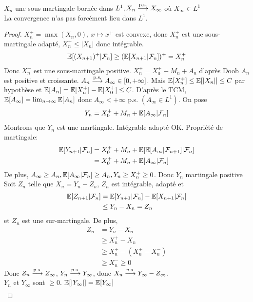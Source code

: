 \documentclass[]{report}
\begin{document}
    \begin{tm}{}{}
        $X_n$ une sous-martingale bornée dans $L^1,X_n \overset{\text{p.s.}}{\longrightarrow} X_\infty$ où $X_\infty\in L^1$ \\
        \danger La convergence n'as pas forcément lieu dans $L^1$.
    \end{tm}

    \begin{proof}
        $X_n^+=\max(X_n,0)$,  $x\mapsto x^+$ est convexe, donc $X_n^+$ est une sous-martingale adapté, $X_n^+\le |X_n|$ donc intégrable.\\
        \[\mathbb{E}[(X_{n+1})^+|\mathcal{F}_n]\ge (\mathbb{E}[X_{n+1}|\mathcal{F}_n])^+=X_n^+\]
        Donc $X_n^+$ est une sous-martingale positive. $X_n^+=X_0^++M_n+A_n$ d'après Doob $A_n$ est positive et croissante. $A_n\overset{\text{p.s.}}{\longrightarrow} A_\infty\in [0,+\infty]$. Mais $\mathbb{E}[X_n^+]\le \mathbb{E}[|X_n|]\le C$ par hypothèse et $\mathbb{E}[A_n]=\mathbb{E}[X_n^+]-\mathbb{E}[X_0^+]\le C$. D'après le TCM, $\mathbb{E}[A_\infty]=\lim_{n\to \infty}\mathbb{E}[A_n]$ donc $A_\infty<+\infty$ p.s. $(A_\infty\in L^1)$. On pose
        \[Y_n=X_0^++M_n+\mathbb{E}[A_\infty|\mathcal{F}_n]\]
        Montrons que $Y_n$ est une martingale. Intégrable adapté OK. Propriété de martingale:
        \begin{align*}
            \mathbb{E}[Y_{n+1}|\mathcal{F}_n]&=X_0^++ M_n+ \mathbb{E}[\mathbb{E}[A_{\infty}|\mathcal{F}_{n+1}]|\mathcal{F}_n]\\
            &= X_0^++M_n+\mathbb{E}[A_\infty|\mathcal{F}_n]
        \end{align*}
        De plus, $A_\infty\ge A_n, \mathbb{E}[A_\infty|\mathcal{F}_n]\ge A_n,Y_n\ge X_n^+\ge 0$. Donc $Y_n$ martingale positive\\
        Soit $Z_n$ telle que $X_n=Y_n-Z_n$, $Z_n$ est intégrable, adapté et
        \begin{align*}
            \mathbb{E}[Z_{n+1}|\mathcal{F}_n]&=\mathbb{E}[Y_{n+1}|\mathcal{F}_n]-\mathbb{E}[X_{n+1}|\mathcal{F}_n]\\
            &\le Y_n-X_n=Z_n
        \end{align*}
        et $Z_n$ est une sur-martingale. De plus,
        \begin{align*}
            Z_n&=Y_n-X_n\\
            &\ge X_n^+-X_n\\
            &\ge X_n^+-(X_n^+-X_n^-)\\
            &\ge X_n^-\ge 0
        \end{align*}
        Donc $Z_n\overset{\text{p.s.}}{\longrightarrow} Z_{\infty}$, $Y_n\overset{\text{p.s.}}{\longrightarrow} Y_\infty$, donc $X_n\overset{\text{p.s.}}{\longrightarrow} Y_\infty-Z_\infty$.\\
        $Y_n$ et $Y_\infty$ sont $\ge 0$. $\mathbb{E}[|Y_\infty|]=\mathbb{E}[Y_\infty]$
        \begin{align*}

\end{align*}
\end{proof}
\end{document}
